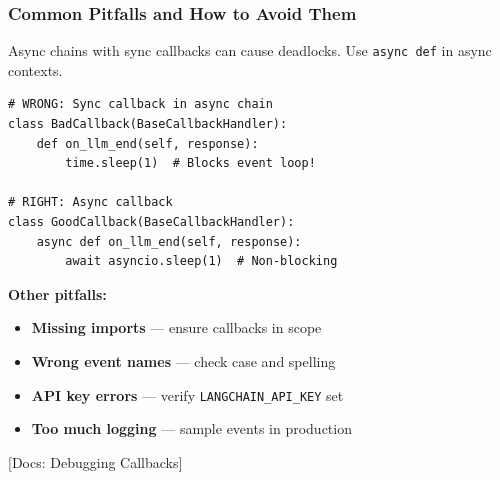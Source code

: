 \documentclass[aspectratio=169,11pt]{beamer}
\newcommand{\docref}[1]{{\scriptsize\color{docgray}[Docs: #1]}}
\begin{document}
\begin{frame}[fragile]
  \frametitle{Common Pitfalls and How to Avoid Them}

  \begin{warningbox}
    Async chains with sync callbacks can cause deadlocks. Use \texttt{async def} in async contexts.
  \end{warningbox}

  \vspace{0.1cm}

  \begin{lstlisting}
# WRONG: Sync callback in async chain
class BadCallback(BaseCallbackHandler):
    def on_llm_end(self, response):
        time.sleep(1)  # Blocks event loop!

# RIGHT: Async callback
class GoodCallback(BaseCallbackHandler):
    async def on_llm_end(self, response):
        await asyncio.sleep(1)  # Non-blocking
  \end{lstlisting}

  \vspace{0.1cm}

  \textbf{Other pitfalls:}
  \begin{itemize}
    \setlength{\itemsep}{1pt}
    \item \textbf{Missing imports} — ensure callbacks in scope
    \item \textbf{Wrong event names} — check case and spelling
    \item \textbf{API key errors} — verify \texttt{LANGCHAIN\_API\_KEY} set
    \item \textbf{Too much logging} — sample events in production
  \end{itemize}

  \docref{Debugging Callbacks}
\end{frame}

\end{document}
